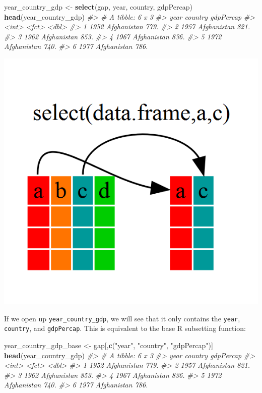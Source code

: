 \documentclass[
]{book}
\newenvironment{Shaded}{\begin{snugshade}}{\end{snugshade}}
\newcommand{\CommentTok}[1]{\textcolor[rgb]{0.56,0.35,0.01}{\textit{#1}}}
\newcommand{\KeywordTok}[1]{\textcolor[rgb]{0.13,0.29,0.53}{\textbf{#1}}}
\newcommand{\NormalTok}[1]{#1}
\newcommand{\StringTok}[1]{\textcolor[rgb]{0.31,0.60,0.02}{#1}}
\begin{document}
\begin{Shaded}
\begin{Highlighting}[]
\NormalTok{year_country_gdp <-}\StringTok{ }\KeywordTok{select}\NormalTok{(gap, year, country, gdpPercap)}
\KeywordTok{head}\NormalTok{(year_country_gdp)}
\CommentTok{#> # A tibble: 6 x 3}
\CommentTok{#>    year country     gdpPercap}
\CommentTok{#>   <int> <fct>           <dbl>}
\CommentTok{#> 1  1952 Afghanistan      779.}
\CommentTok{#> 2  1957 Afghanistan      821.}
\CommentTok{#> 3  1962 Afghanistan      853.}
\CommentTok{#> 4  1967 Afghanistan      836.}
\CommentTok{#> 5  1972 Afghanistan      740.}
\CommentTok{#> 6  1977 Afghanistan      786.}
\end{Highlighting}
\end{Shaded}

\begin{center}\includegraphics[width=0.7\linewidth]{img/dplyr-fig1} \end{center}

If we open up \texttt{year\_country\_gdp}, we will see that it only contains the \texttt{year}, \texttt{country}, and \texttt{gdpPercap}. This is equivalent to the base R subsetting function:

\begin{Shaded}
\begin{Highlighting}[]
\NormalTok{year_country_gdp_base <-}\StringTok{ }\NormalTok{gap[,}\KeywordTok{c}\NormalTok{(}\StringTok{"year"}\NormalTok{, }\StringTok{"country"}\NormalTok{, }\StringTok{"gdpPercap"}\NormalTok{)]}
\KeywordTok{head}\NormalTok{(year_country_gdp)}
\CommentTok{#> # A tibble: 6 x 3}
\CommentTok{#>    year country     gdpPercap}
\CommentTok{#>   <int> <fct>           <dbl>}
\CommentTok{#> 1  1952 Afghanistan      779.}
\CommentTok{#> 2  1957 Afghanistan      821.}
\CommentTok{#> 3  1962 Afghanistan      853.}
\CommentTok{#> 4  1967 Afghanistan      836.}
\CommentTok{#> 5  1972 Afghanistan      740.}
\CommentTok{#> 6  1977 Afghanistan      786.}
\end{Highlighting}
\end{Shaded}
\end{document}
